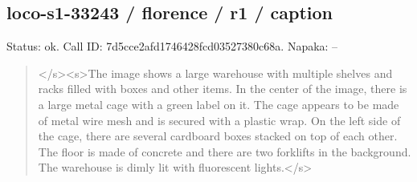 \documentclass[10pt,a4paper]{article}
\begin{document}
\subsection*{loco-s1-33243 / florence / r1 / caption}
Status: ok. Call ID: 7d5cce2afd1746428fcd03527380c68a. Napaka: --
\begin{quote}\footnotesize
</s>\allowbreak{}<s>\allowbreak{}The image shows a large warehouse with multiple shelves and racks filled with boxes and other items. In the center of the image,\allowbreak{} there is a large metal cage with a green label on it. The cage appears to be made of metal wire mesh and is secured with a plastic wrap. On the left side of the cage,\allowbreak{} there are several cardboard boxes stacked on top of each other. The floor is made of concrete and there are two forklifts in the background. The warehouse is dimly lit with fluorescent lights.</s>\allowbreak{}
\end{quote}
\end{document}
